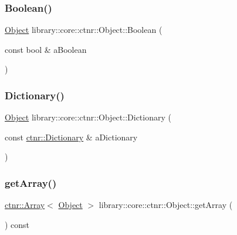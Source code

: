 \mbox{\label{classlibrary_1_1core_1_1ctnr_1_1_object_af13e21c1db9225dd82afae1e4e120b09}} 
\subsubsection{\texorpdfstring{Boolean()}{Boolean()}}
{\footnotesize\ttfamily \mbox{\hyperlink{classlibrary_1_1core_1_1ctnr_1_1_object}{Object}} library\+::core\+::ctnr\+::\+Object\+::\+Boolean (\begin{DoxyParamCaption}\item[{const bool \&}]{a\+Boolean }\end{DoxyParamCaption})\hspace{0.3cm}{\ttfamily [static]}}

\mbox{\label{classlibrary_1_1core_1_1ctnr_1_1_object_ad48d5cee784b2ca83db19df024002bca}} 
\subsubsection{\texorpdfstring{Dictionary()}{Dictionary()}}
{\footnotesize\ttfamily \mbox{\hyperlink{classlibrary_1_1core_1_1ctnr_1_1_object}{Object}} library\+::core\+::ctnr\+::\+Object\+::\+Dictionary (\begin{DoxyParamCaption}\item[{const \mbox{\hyperlink{classlibrary_1_1core_1_1ctnr_1_1_dictionary}{ctnr\+::\+Dictionary}} \&}]{a\+Dictionary }\end{DoxyParamCaption})\hspace{0.3cm}{\ttfamily [static]}}

\mbox{\label{classlibrary_1_1core_1_1ctnr_1_1_object_af72b48798c45695b7b225a961c57d8d0}} 
\subsubsection{\texorpdfstring{getArray()}{getArray()}}
{\footnotesize\ttfamily \mbox{\hyperlink{classlibrary_1_1core_1_1ctnr_1_1_array}{ctnr\+::\+Array}}$<$ \mbox{\hyperlink{classlibrary_1_1core_1_1ctnr_1_1_object}{Object}} $>$ library\+::core\+::ctnr\+::\+Object\+::get\+Array (\begin{DoxyParamCaption}{ }\end{DoxyParamCaption}) const}

